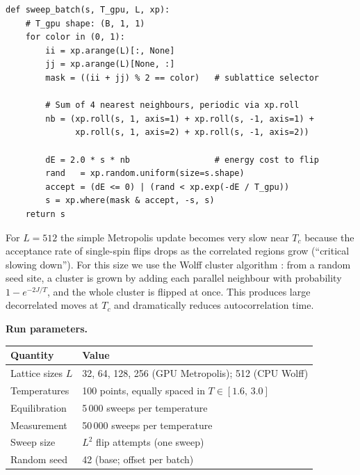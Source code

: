 \documentclass[12pt,a4paper]{article}
\begin{document}
\begin{lstlisting}[caption={Checkerboard Metropolis sweep (\texttt{ising.py}).
\texttt{s} has shape \texttt{(B, L, L)} for $B$ batched temperatures.
\texttt{xp} is either \texttt{cupy} (GPU) or \texttt{numpy} (CPU).}]
def sweep_batch(s, T_gpu, L, xp):
    # T_gpu shape: (B, 1, 1)
    for color in (0, 1):
        ii = xp.arange(L)[:, None]
        jj = xp.arange(L)[None, :]
        mask = ((ii + jj) % 2 == color)   # sublattice selector

        # Sum of 4 nearest neighbours, periodic via xp.roll
        nb = (xp.roll(s, 1, axis=1) + xp.roll(s, -1, axis=1) +
              xp.roll(s, 1, axis=2) + xp.roll(s, -1, axis=2))

        dE = 2.0 * s * nb                 # energy cost to flip
        rand   = xp.random.uniform(size=s.shape)
        accept = (dE <= 0) | (rand < xp.exp(-dE / T_gpu))
        s = xp.where(mask & accept, -s, s)
    return s
\end{lstlisting}

For $L = 512$ the simple Metropolis update becomes very slow near $T_c$ because the
acceptance rate of single-spin flips drops as the correlated regions grow (``critical
slowing down''). For this size we use the Wolff cluster algorithm \cite{newman}: from a
random seed site, a cluster is grown by adding each parallel neighbour with probability
$1 - e^{-2J/T}$, and the whole cluster is flipped at once. This produces large
decorrelated moves at $T_c$ and dramatically reduces autocorrelation time.

\textbf{Run parameters.}
\begin{center}
\begin{tabular}{ll}
\toprule
Quantity & Value \\
\midrule
Lattice sizes $L$ & 32, 64, 128, 256 (GPU Metropolis); 512 (CPU Wolff) \\
Temperatures & 100 points, equally spaced in $T \in [1.6,\, 3.0]$ \\
Equilibration & 5\,000 sweeps per temperature \\
Measurement   & 50\,000 sweeps per temperature \\
Sweep size    & $L^2$ flip attempts (one sweep) \\
Random seed   & 42 (base; offset per batch) \\
\bottomrule
\end{tabular}
\end{center}
\end{document}
